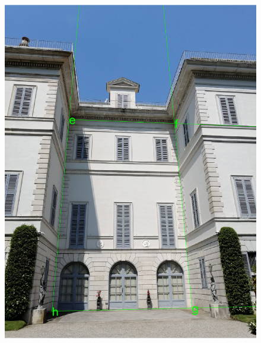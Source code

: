 \documentclass[11pt, oneside]{article}
\begin{document}
\begin{figure}[!h]
	\centering
	\begin{minipage}{.45\textwidth}
		\centering
		\includegraphics[scale = 0.4]{image_two_original_vertical_vp.png}
		\label{image_two_original_vertical_vp}
	\end{minipage}%
	\quad
	\begin{minipage}{.5\textwidth}
		\centering

\end{minipage}
\end{figure}
\end{document}
